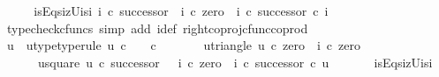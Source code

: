 \begin{isabellebody}
\ \ \isamarkupfalse%
\ \isamarkupfalse%
\ i{}{\isacharunderscore}{\kern0pt}sEqs{\isacharunderscore}{\kern0pt}i{}zUi{}s{\isacharunderscore}{\kern0pt}i{}{\isacharcolon}{\kern0pt}\ {\isachardoublequoteopen}i{}\ {\isasymcirc}\isactrlsub c\ successor\ {\isacharequal}{\kern0pt}\ {\isacharparenleft}{\kern0pt}{\isacharparenleft}{\kern0pt}i{}\ {\isasymcirc}\isactrlsub c\ zero{\isacharparenright}{\kern0pt}\ {\isasymamalg}\ {\isacharparenleft}{\kern0pt}i{}\ {\isasymcirc}\isactrlsub c\ successor{\isacharparenright}{\kern0pt}{\isacharparenright}{\kern0pt}\ {\isasymcirc}\isactrlsub c\ i{}{\isachardoublequoteclose}\isanewline
\ \ \ \ \isamarkupfalse%
\ {\isacharparenleft}{\kern0pt}typecheck{\isacharunderscore}{\kern0pt}cfuncs{\isacharcomma}{\kern0pt}\ simp\ add{\isacharcolon}{\kern0pt}\ i{}{\isacharunderscore}{\kern0pt}def\ right{\isacharunderscore}{\kern0pt}coproj{\isacharunderscore}{\kern0pt}cfunc{\isacharunderscore}{\kern0pt}coprod{\isacharparenright}{\kern0pt}\ \ \ \isanewline
\ \ \isamarkupfalse%
\ \isamarkupfalse%
\ u\ \ u{\isacharunderscore}{\kern0pt}type{\isacharbrackleft}{\kern0pt}type{\isacharunderscore}{\kern0pt}rule{\isacharbrackright}{\kern0pt}{\isacharcolon}{\kern0pt}\ {\isachardoublequoteopen}{\isacharparenleft}{\kern0pt}u{\isacharcolon}{\kern0pt}\ {\isasymnat}\isactrlsub c\ {\isasymrightarrow}\ {\isacharparenleft}{\kern0pt}{\isasymone}\ {\isasymCoprod}\ {\isasymnat}\isactrlsub c{\isacharparenright}{\kern0pt}{\isacharparenright}{\kern0pt}{\isachardoublequoteclose}\ \isanewline
\ \ \ \ \ \ u{\isacharunderscore}{\kern0pt}triangle{\isacharcolon}{\kern0pt}\ {\isachardoublequoteopen}u\ {\isasymcirc}\isactrlsub c\ zero\ {\isacharequal}{\kern0pt}\ i{}\ {\isasymcirc}\isactrlsub c\ zero{\isachardoublequoteclose}\ \isanewline
\ \ \ \ \ \ u{\isacharunderscore}{\kern0pt}square{\isacharcolon}{\kern0pt}\ {\isachardoublequoteopen}u\ {\isasymcirc}\isactrlsub c\ successor\ {\isacharequal}{\kern0pt}\ \ {\isacharparenleft}{\kern0pt}{\isacharparenleft}{\kern0pt}i{}\ {\isasymcirc}\isactrlsub c\ zero{\isacharparenright}{\kern0pt}\ {\isasymamalg}\ {\isacharparenleft}{\kern0pt}i{}\ {\isasymcirc}\isactrlsub c\ successor{\isacharparenright}{\kern0pt}{\isacharparenright}{\kern0pt}\ {\isasymcirc}\isactrlsub c\ u\ {\isachardoublequoteclose}\isanewline
\ \ \ \ \isamarkupfalse%
\ i{}{\isacharunderscore}{\kern0pt}sEqs{\isacharunderscore}{\kern0pt}i{}zUi{}s{\isacharunderscore}{\kern0pt}i{}\ \isamarkupfalse%

\end{isabellebody}

